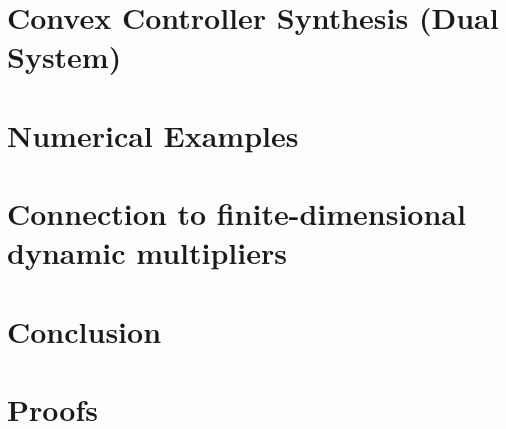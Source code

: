 \documentclass[final,5p,twocolumn]{elsarticle}
\begin{document}
\section{Convex Controller Synthesis (Dual System)}\label{sec:dual-controller-synthesis}
\dualsystemcomponents


\section{Numerical Examples}\label{sec:numerical-examples}


\section{Connection to finite-dimensional dynamic multipliers}\label{sec:finite-dimensional-multipliers}
\label{sec:finite-dimensional-dynamic-multipliers}


\section{Conclusion}\label{sec:conclusion}






\onecolumn
\appendix
\renewcommand{\thesubsection}{\thesection.\arabic{subsection}}
\section{Proofs}




\vspace{12pt}
\end{document}

